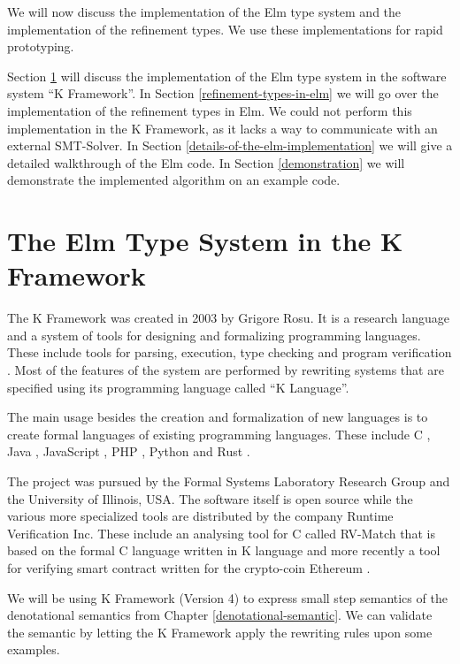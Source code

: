 \documentclass[]{scrbook}
\theoremstyle{definition}
\theoremstyle{definition}
\theoremstyle{definition}
\theoremstyle{remark}
\begin{document}
We will now discuss the implementation of the Elm type system and the
implementation of the refinement types. We use these implementations for
rapid prototyping.

Section \ref{the-elm-type-system-in-the-k-framework} will discuss the
implementation of the Elm type system in the software system
\enquote{K Framework}. In Section \ref{refinement-types-in-elm} we will
go over the implementation of the refinement types in Elm. We could not
perform this implementation in the K Framework, as it lacks a way to
communicate with an external SMT-Solver. In Section
\ref{details-of-the-elm-implementation} we will give a detailed
walkthrough of the Elm code. In Section \ref{demonstration} we will
demonstrate the implemented algorithm on an example code.

\section{The Elm Type System in the K
Framework}\label{the-elm-type-system-in-the-k-framework}

The K Framework \autocite{K_framework} was created in 2003 by Grigore
Rosu. It is a research language and a system of tools for designing and
formalizing programming languages. These include tools for parsing,
execution, type checking and program verification
\autocite{Kframework_verification}. Most of the features of the system
are performed by rewriting systems that are specified using its
programming language called \enquote{K Language}.

The main usage besides the creation and formalization of new languages
is to create formal languages of existing programming languages. These
include C \autocite{Kframework_C}, Java \autocite{Kframework_Java},
JavaScript \autocite{Kframework_Js}, PHP \autocite{Kframework_Php},
Python \autocite{Kframework_Python} and Rust \autocite{Kframework_Rust}.

The project was pursued by the Formal Systems Laboratory Research Group
and the University of Illinois, USA. The software itself is open source
while the various more specialized tools are distributed by the company
Runtime Verification Inc. These include an analysing tool for C called
RV-Match that is based on the formal C language written in K language
\autocite{Kframework_rvMatch} and more recently a tool for verifying
smart contract written for the crypto-coin Ethereum
\autocite{Kframework_KEVM}.

We will be using K Framework (Version 4) to express small step semantics
of the denotational semantics from Chapter \ref{denotational-semantic}.
We can validate the semantic by letting the K Framework apply the
rewriting rules upon some examples.
\end{document}
